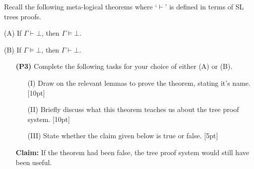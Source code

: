 \documentclass[12pt]{article}
\begin{document}
\bigskip

\noindent
Recall the following meta-logical theorems where `$\vdash$' is defined in terms of SL trees proofs.\\

\bigskip

  \begin{itemize}[leftmargin=1.5in]
    \begin{multicols}{2}
    \item[\sc (A)] If $\Gamma \vdash \bot$, then $\Gamma \vDash \bot$.
    \item[\sc (B)] If $\Gamma \vDash \bot$, then $\Gamma \vdash \bot$.
    \end{multicols}
  \end{itemize}

\bigskip

\begin{enumerate}

  \item[\bf (P3)] Complete the following tasks for your choice of either \textsc{(A)} or \textsc{(B)}.
    \begin{itemize}
      \item[(I)] Draw on the relevant lemmas to prove the theorem, stating it's name. [10pt]
      \item[(II)] Briefly discuss what this theorem teaches us about the tree proof system. [10pt]
      \item[(III)] State whether the claim given below is true or false. [5pt]
    \end{itemize}
  \item[\bf Claim:] If the theorem had been false, the tree proof system would still have been useful.

\bigskip


\end{enumerate}
\end{document}
